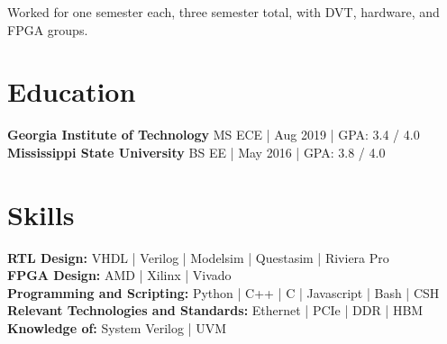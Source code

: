 \documentclass[10pt]{deedy-resume-reversed}
\begin{document}
\begin{minipage}[t]{1.0\textwidth}
\begin{tightemize}
\item Worked for one semester each, three semester total, with DVT, hardware, and FPGA groups.
\end{tightemize}
\sectionsep



\section{Education}
\textbf{Georgia Institute of Technology} MS ECE | Aug 2019 | GPA: 3.4 / 4.0 \\ 
\textbf{Mississippi State University} BS EE | May 2016 | GPA: 3.8 / 4.0 \\
\sectionsep




\section{Skills}
\textbf{RTL Design:} VHDL | Verilog | Modelsim | Questasim | Riviera Pro \\ 
\textbf{FPGA Design:} AMD | Xilinx | Vivado \\
\textbf{Programming and Scripting:} Python | C++ | C | Javascript | Bash | CSH \\
\textbf{Relevant Technologies and Standards:} Ethernet | PCIe | DDR | HBM \\
\textbf{Knowledge of:} System Verilog | UVM \\
\sectionsep


\end{minipage}
\end{document}
